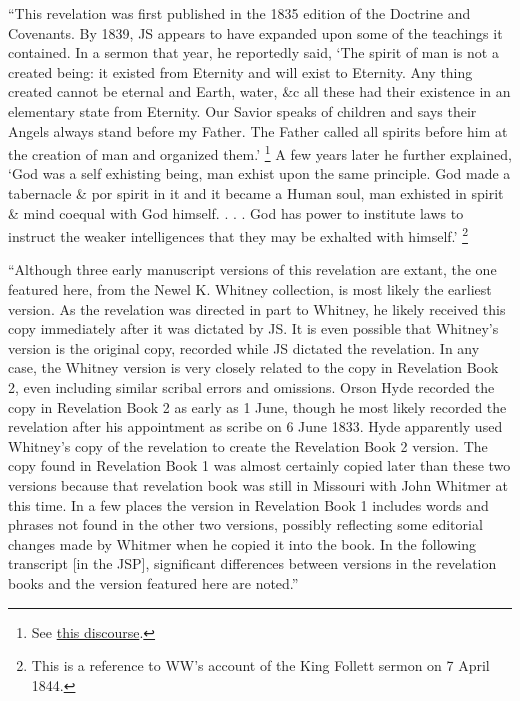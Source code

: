 			``This revelation was first published in the 1835 edition of the Doctrine and Covenants. By 1839, JS appears to have expanded upon some of the teachings it contained. In a sermon that year, he reportedly said, `The spirit of man is not a created being: it existed from Eternity and will exist to Eternity. Any thing created cannot be eternal and Earth, water, \&c all these had their existence in an elementary state from Eternity. Our Savior speaks of children and says their Angels always stand before my Father. The Father called all spirits before him at the creation of man and organized them.'%
				\footnote{%
					See \hyperref[EMS-1839-JS-CIR-26-JUN-CIR-4-AUG-1839-A]{this discourse}.
					}
			A few years later he further explained, `God was a self exhisting being, man exhist upon the same principle. God made a tabernacle \& por spirit in it and it became a Human soul, man exhisted in spirit \& mind coequal with God himself. . . . God has power to institute laws to instruct the weaker intelligences that they may be exhalted with himself.'%
				\footnote{%
					This is a reference to WW's account of the King Follett sermon on 7 April 1844.
					}

			``Although three early manuscript versions of this revelation are extant, the one featured here, from the Newel K. Whitney collection, is most likely the earliest version. As the revelation was directed in part to Whitney, he likely received this copy immediately after it was dictated by JS. It is even possible that Whitney's version is the original copy, recorded while JS dictated the revelation. In any case, the Whitney version is very closely related to the copy in Revelation Book 2, even including similar scribal errors and omissions. Orson Hyde recorded the copy in Revelation Book 2 as early as 1 June, though he most likely recorded the revelation after his appointment as scribe on 6 June 1833. Hyde apparently used Whitney's copy of the revelation to create the Revelation Book 2 version. The copy found in Revelation Book 1 was almost certainly copied later than these two versions because that revelation book was still in Missouri with John Whitmer at this time. In a few places the version in Revelation Book 1 includes words and phrases not found in the other two versions, possibly reflecting some editorial changes made by Whitmer when he copied it into the book. In the following transcript [in the JSP], significant differences between versions in the revelation books and the version featured here are noted.''
			
